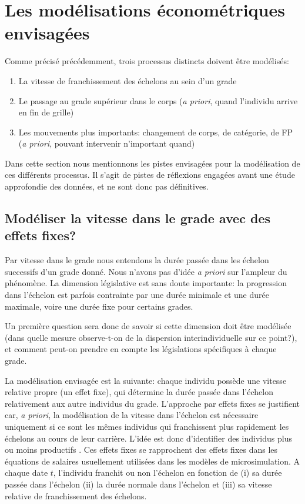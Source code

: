 \documentclass[11pt,a4paper]{article}
\begin{document}
\else \fi



\section{Les modélisations économétriques envisagées}

Comme précisé précédemment, trois processus distincts doivent être modélisés: 
\begin{enumerate}[leftmargin=1cm ,parsep=0cm,itemsep=0cm,topsep=0cm]
\item La vitesse de franchissement des échelons au sein d'un grade
\item Le passage au grade supérieur dans le corps (\textit{a priori}, quand l'individu arrive en fin de grille)
\item Les mouvements plus importants: changement de corps, de catégorie, de FP (\textit{a priori}, pouvant intervenir n'important quand)
\end{enumerate}

Dans cette section nous mentionnons les pistes envisagées pour la modélisation de ces différents processus. Il s'agit de pistes de réflexions engagées avant une étude approfondie des données, et ne sont donc pas définitives. 


\subsection{Modéliser la vitesse dans le grade avec des effets fixes?}

Par vitesse dans le grade nous entendons la durée passée dans les échelon successifs d'un grade donné. Nous n'avons pas d'idée \textit{a priori} sur l'ampleur du phénomène. La dimension législative est sans doute importante: la progression dans l'échelon est parfois contrainte par une durée minimale et une durée maximale, voire une durée fixe pour certains grades. 

Un première question sera donc de savoir si cette dimension doit être modélisée (dans quelle mesure observe-t-on de la dispersion interindividuelle sur ce point?), et comment peut-on prendre en compte les législations spécifiques à chaque grade. 

La modélisation envisagée est la suivante: chaque individu possède une vitesse relative propre (un effet fixe), qui détermine la durée passée dans l'échelon relativement aux autre individus du grade. L'approche par effets fixes se justifient car, \textit{a priori}, la modélisation de la vitesse dans l'échelon est nécessaire uniquement si ce sont les mêmes individus qui franchissent plus rapidement les échelons au cours de leur carrière. L'idée est donc d'identifier des individus plus ou moins \og productifs \fg{}. Ces effets fixes se rapprochent des effets fixes dans les équations de salaires usuellement utilisées dans les modèles de microsimulation.  
A chaque date $t$, l'individu franchit ou non l'échelon en fonction de (i) sa durée passée dans l'échelon (ii) la durée \og normale \fg{} dans l'échelon et (iii) sa vitesse relative de franchissement des échelons. 
\end{document}
